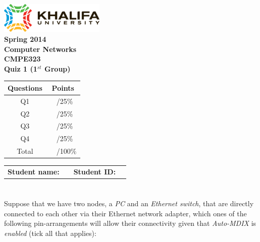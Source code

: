 \documentclass[pdftex,12pt,a4paper]{article}
\begin{document}
    \begin{titlepage}
        \begin{center}
            \includegraphics[width=5cm]{figures/kulogo}\\[1cm]
            {\large \bfseries
                Spring 2014\\
                Computer Networks\\
                CMPE323\\[1cm]
            }
            {\large \bfseries
                \noindent Quiz 1 (1$^{st}$ Group)\\[1cm]
            }
        \end{center}

        \begin{center}
            \begin{tabular}{|c|p{1cm}l|}\hline
                \textbf{Questions} & \multicolumn{2}{|c|}{\textbf{Points}} \\\hline
                Q1                &    &    /25\%   \\
                Q2                &    &    /25\%   \\
                Q3                &    &    /25\%   \\
                Q4                &    &    /25\%   \\\hline
                Total             &    &    /100\%  \\\hline
            \end{tabular}
        \end{center}

        \vfill
        \begin{tabular}{lp{5cm}ll}
            \textbf{Student name:} & & \textbf{Student ID:} & \\
        \end{tabular}


    \end{titlepage}
    \newpage

    \section{}
        Suppose that we have two nodes, a \emph{PC} and an \emph{Ethernet
        switch}, that are directly connected to each other via their Ethernet
        network adapter, which ones of the following pin-arrangements will
        allow their connectivity given that \emph{Auto-MDIX} is \emph{enabled}
        (tick all that applies):
\end{document}
